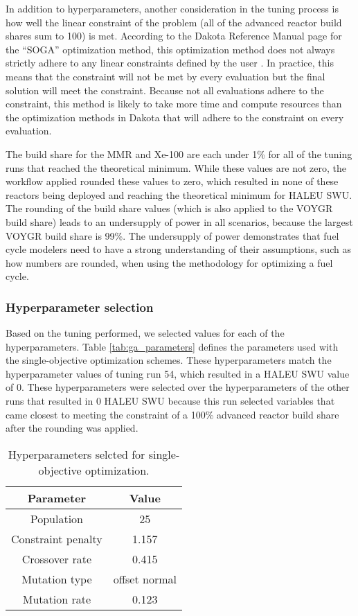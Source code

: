 In addition to hyperparameters, another consideration in the tuning process 
is how well the linear constraint of the problem (all of the advanced 
reactor build shares sum to 100) is met. According to the Dakota 
Reference Manual page for the ``SOGA'' optimization method, this 
optimization method does not always strictly adhere to any linear 
constraints defined by the user \cite{adams_dakota_2019}. In practice, 
this means that the constraint will not be met by every evaluation but the 
final solution will meet the constraint. Because not all evaluations 
adhere to the constraint, this method is likely to take more time and 
compute resources than the optimization methods in Dakota that will 
adhere to the constraint on every evaluation. 

The build share for the \gls{MMR} and Xe-100 are each under 1\% for all of 
the tuning runs that reached the theoretical minimum. While these values 
are not zero, the workflow applied rounded these values to zero, which resulted 
in none of these reactors being deployed and reaching the theoretical 
minimum for \gls{HALEU} {SWU}. The rounding of the build share values (which 
is also applied to the VOYGR build share) leads to an undersupply of 
power in all scenarios, because the largest VOYGR build share is 99\%. 
The undersupply of power demonstrates that fuel cycle modelers need to have 
a strong understanding of their assumptions, such as how numbers are rounded, 
when using the methodology for optimizing a fuel cycle. 

\subsubsection{Hyperparameter selection}
Based on the tuning performed, we selected values for each of the 
hyperparameters. Table \ref{tab:ga_parameters} defines the 
parameters used with the single-objective optimization schemes. These 
hyperparameters match the hyperparameter values of tuning run 54, 
which resulted in a \gls{HALEU} \gls{SWU} value of 0. These hyperparameters 
were selected over the hyperparameters of the other runs that resulted in 
0 \gls{HALEU} \gls{SWU} because this run selected variables that came closest to 
meeting the constraint of a 100\% advanced reactor build share after the rounding 
was applied. 

\begin{table}
    \centering
    \caption{Hyperparameters selcted for single-objective optimization.}
    \label{tab:soga_parameters}
    \begin{tabular}{c c}
        \hline
        Parameter & Value \\
        \hline
        Population & 25 \\
        Constraint penalty & 1.157\\
        Crossover rate & 0.415\\
        Mutation type & offset normal\\
        Mutation rate & 0.123\\
        \hline
        
    \end{tabular}
\end{table}

